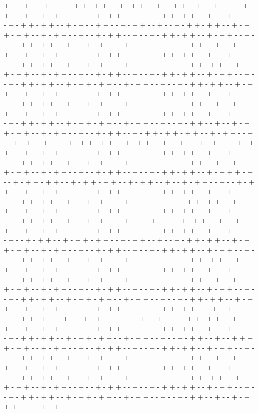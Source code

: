 + - + + - + + - - + - + + - + + - - + - + + - - + - - + + + + - - + - - + - + + - + + - - + - + + - - + - - + - + + - - + - - + - + + - + + - - + - + + - - + - - + - + + - + + - - + - + - - + + - - + - + + - - + - - + - + + - + + - - + - + + - + + - - + - + + - - + - - + - + + - - + - - + - + + - + + - - + - + + - - + - - + - + + - + + - - + - + + - + + - - + - + + - - + - - + - + + - - + - - + - + + - + + - - + - + + - - + - - + - + + - - + - - + - + + - + + - - + - + + - - + - - + - + + - + + - - + - + + - + + - - + - + + - - + - - + - + + - + + - - + - + + - + + - - + - + + - - + - - + - + + - - + - - + - + + - + + - - + - + + - - + - - + - + + - + + - - + - + + - + + - - + - + + - - + - - + - + + - + + - - + - + + - + + - - + - + + - - + - - + - + + - - + - - + - + + - + + - - + - + + - - + - - + - + + - + + - - + - + + - + + - - + - + + - - + - - + - + + - - + - - + - + + - + + - - + - + + - - + - - + - + + - - + - - + - + + - + + - - + - + + - - + - - + - + + - + + - - + - + + - + + - - + - + + - - + - - + - + + - - + - - + - + + - + + - - + - + + - - + - - + - + + - - + - + + - + + - + + - - + - + + - - + - - + - + - - + + - - + - + + - + + - - + - + + - - + - - + - + + - + + - - + - + + - + + - - + - + + - - + - - + - + + - - + - - + - + + - + + - - + - + + - - + - - + - + + - + + - - + - + + - + + - - + - + + - - + - - + - + + - - + - - + - + + - + + - - + - + + - - + - - + - + + - - + - - + - + + - + + - - + - + + + - + - - + - + + - + + - - + - + + - + + - - + - + + - - + - - + - + + - - + - - + - + + - + + - - + - + + - - + - - + - + + - - + - - + - + + - + + - - + - + + - - + - - + - + + - + + - - + - + + - + + - - + - + + - - - - - + - + + - + + - - + - + + - + + - - + - + + - - + - - + - + + - - + - - + - + + - + + - - + - + + - - + - - + - + + - + + - - + - + + - + + - - + - + + + - + - - + - + + - - + - - + - + + - + + - - + - + + - - + - - + - + + - - + - - + - + + - + + - - + - + + - - + - - + - - + - + + - - + - + + - + + - - + - + + - - + - - + - + + - + + - - + - + + - + + - - + - + + - - + - - + - + + - - + - - + - + + - + + - - + - + + - - + - - + - + + - + + - - + - + + - + + - - + - + + - - + - - + - + + - + + - - + - + + - + + - - + - + + - - + - - + - + + - - + - - + - + + - + + - - + - + + - - + - - + - + + - + + - - + - + + - + + - - + - + + - - + - - + - + + - - + - - + - + + - + + - - + - + + - - + - - + - + + - - + - - + - + + - + + - - + - + + - - + - - + - + + - + + - - + - + + - + + - - + - + + - - + - - + - + + - + + - - + - + + - + + - - + - + + - - + - - + - + + - - + - - + - + + - + + - - - + + + - - + - - + - + + - + - - - + - + + - + + - - + - + + - - + - - + - + + - + + - - + - + + - + + - - + - + + - - + - - + - + + - - + - - + - + + - + + - - + - + + - - + - - + - + + - + + - - + - + + - + + - - + - + + - - + - - + - + + - - + - - + + + + - + + - - + - + + - - + - - + - + + - - + - - + - + + - + + - - + - + + - - + - - + - + + - + + - - + - + + - + + - - + - + + - - + - - + - + + - - + - - + - + + - + + - - + - + + - - + - - + - + + - - + - - + - + + - + + - - + - + + - - + - - + - + + - + + - - + - + + - + + - - + - + + - - + - - + - + + - + + - - + - + + - + + - - + - + + - - + - - + - + + - - + - - + - + + - + + - - + - + + - - + - - + - + + - + + - - + - + + - + + - - + - + + - - + - - + - + + - - + - - + - + + + + - - - + - + 